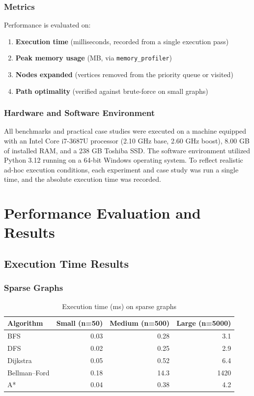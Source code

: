 \documentclass[12pt, a4paper, oneside]{report}
\theoremstyle{definition}
\begin{document}
\subsection{Metrics}

Performance is evaluated on:
\begin{enumerate}
    \item \textbf{Execution time} (milliseconds, recorded from a single execution pass)
    \item \textbf{Peak memory usage} (MB, via \texttt{memory\_profiler})
    \item \textbf{Nodes expanded} (vertices removed from the priority queue or visited)
    \item \textbf{Path optimality} (verified against brute-force on small graphs)
\end{enumerate}

\subsection{Hardware and Software Environment}

All benchmarks and practical case studies were executed on a machine equipped with an Intel Core i7-3687U processor (2.10 GHz base, 2.60 GHz boost), 8.00 GB of installed RAM, and a 238 GB Toshiba SSD. The software environment utilized Python 3.12 running on a 64-bit Windows operating system. To reflect realistic ad-hoc execution conditions, each experiment and case study was run a single time, and the absolute execution time was recorded.

\chapter{Performance Evaluation and Results}

\section{Execution Time Results}

\subsection{Sparse Graphs}

\begin{table}[H]
\centering
\caption{Execution time (ms) on sparse graphs}
\label{tab:time_sparse}
\begin{tabular}{lrrr}
\toprule
\textbf{Algorithm} & \textbf{Small (n=50)} & \textbf{Medium (n=500)} & \textbf{Large (n=5000)} \\
\midrule
BFS           & 0.03  & 0.28  & 3.1  \\
DFS           & 0.02  & 0.25  & 2.9  \\
Dijkstra      & 0.05  & 0.52  & 6.4  \\
Bellman–Ford  & 0.18  & 14.3  & 1420 \\
A* & 0.04  & 0.38  & 4.2  \\
\bottomrule
\end{tabular}
\end{table}
\end{document}
